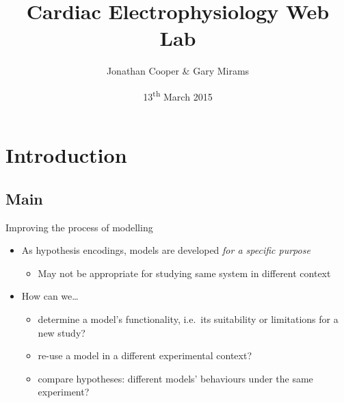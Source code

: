 \documentclass[t,xcolor={usenames,dvipsnames}]{beamer}
\title{Cardiac Electrophysiology Web Lab}
\author{Jonathan Cooper \& Gary Mirams}
\institute[University of Oxford]
{Computational Biology Group\\
 Department of Computer Science\\
 University of Oxford}
\date{13\textsuperscript{th} March 2015}
\newcommand{\subitem}[1]{\begin{itemize}[<.->]\item #1 \end{itemize}}
\begin{document}
\begin{frame}
\titlepage
\end{frame}



\section{Introduction}
\subsection*{Main}

\begin{frame}{Improving the process of modelling}
\begin{itemize}[<2>]
\item As hypothesis encodings, models are developed \emph{for a specific purpose}
  \subitem{May not be appropriate for studying same system in different context}
\item How can we\ldots
  \begin{itemize}
  \item determine a model's functionality, i.e.\ its suitability or limitations for a new study? %
  \item re-use a model in a different experimental context?
  \item compare hypotheses: different models' behaviours under the same experiment?
  \end{itemize}
\end{itemize}
\end{frame}
\end{document}
